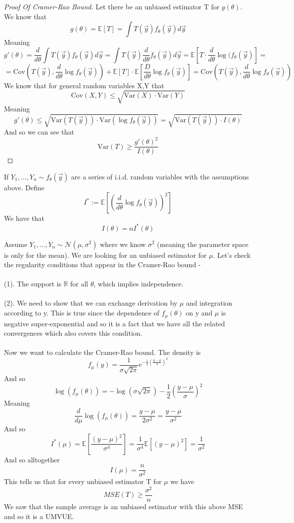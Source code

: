 \documentclass[../main.tex]{subfiles}
\begin{document}
\begin{proof}[Proof Of Cramer-Rao Bound]
Let there be an unbiased estimator T for $g(\theta)$. We know that
\[g(\theta) = \mathbb{E}[T] = \int T(\overrightarrow{y})f_{\theta}(\overrightarrow{y}) d\overrightarrow{y}\]
Meaning 
\[g'(\theta) = \frac{d}{d\theta}\int T(\overrightarrow{y})f_{\theta}(\overrightarrow{y}) d\overrightarrow{y} = \int T(\overrightarrow{y}) \frac{d}{d\theta} f_{\theta}(\overrightarrow{y}) d\overrightarrow{y} = \mathbb{E}\left[T\cdot \frac{d}{d\theta} \log(f_{\theta}(\overrightarrow{y})\right]=\]
\[=\text{Cov}(T(\overrightarrow{y}), \frac{d}{d\theta}\log f_{\theta}(\overrightarrow{y})) + \mathbb{E}[T]\cdot\mathbb{E}[\frac{D}{d\theta} \log f_\theta(\overrightarrow{y})] = \text{Cov}(T(\overrightarrow{y}), \frac{d}{d\theta}\log f_{\theta}(\overrightarrow{y}))\]
We know that for general random variables X,Y that
\[\text{Cov}(X,Y)\leq \sqrt{\text{Var}(X)\cdot\text{Var}(Y)}\]
Meaning
\[g'(\theta)\leq \sqrt{\text{Var}(T(\overrightarrow{y}))\cdot\text{Var}(\log f_{\theta}(\overrightarrow{y}))} = \sqrt{\text{Var}(T(\overrightarrow{y}))\cdot I(\theta)}\]
And so we can see that 
\[\text{Var}(T)\geq \frac{g'(\theta)^2}{I(\theta)}\]
\end{proof}
\begin{claim}
If $Y_1,\dots,Y_n\sim f_{\theta}(\overrightarrow{y})$ are a series of i.i.d. random variables with the assumptions above. Define
\[I^{*}:=\mathbb{E}\left[\left(\frac{d}{d\theta} \log f_{\theta}(\overrightarrow{y})\right)^2\right]\]
We have that \[I(\theta) = nI^*(\theta)\]
\end{claim}
\begin{example}
Assume $Y_1,\dots,Y_n\sim\mathcal{N}(\mu,\sigma^2)$ where we know $\sigma^2$ (meaning the parameter space is only for the mean). We are looking for an unbiased estimator for $\mu$. Let's check the regularity conditions that appear in the Cramer-Rao bound - \\\\
(1). The support is $\mathbb{R}$ for all $\theta$, which implies independence. \\\\
(2). We need to show that we can exchange derivation by $\mu$ and integration according to y. This is true since the dependence of $f_\mu(\theta)$ on y and $\mu$ is negative super-exponential and so it is a fact that we have all the related convergences which also covers this condition. \\\\
Now we want to calculate the Cramer-Rao bound. The density is 
\[f_\mu(y) = \frac{1}{\sigma\sqrt{2\pi}} e^{-\frac{1}{2}(\frac{y-\mu}{\sigma})^2}\]
\newpage
And so
\[\log(f_\mu(\theta)) = -\log(\sigma\sqrt{2\pi}) - \frac{1}{2} \left(\frac{y-\mu}{\sigma}\right)^2\]
Meaning 
\[\frac{d}{d\mu} \log(f_\mu(\theta))= \frac{y-\mu}{2\sigma^2} = \frac{y-\mu}{\sigma^2}\]
And so 
\[I^*(\mu) = \mathbb{E}\left[\frac{(y-\mu)^2}{\sigma^4}\right] = \frac{1}{\sigma^4} \mathbb{E}[(y-\mu)^2] = \frac{1}{\sigma^2}\]
And so alltogether
\[I(\mu) = \frac{n}{\sigma^2}\]
This tells us that for every unbiased estimator T for $\mu$ we have
\[MSE(T)\geq\frac{\sigma^2}{n}\]
We saw that the sample average is an unbiased estimator with this above MSE and so it is a UMVUE. 
\end{example}
\end{document}
